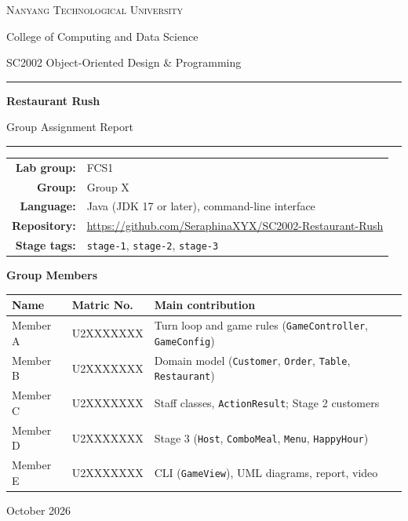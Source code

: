 \documentclass[11pt,a4paper]{article}
\begin{document}
\begin{titlepage}
\centering
\vspace*{0.6cm}
{\large\scshape Nanyang Technological University\par}
{\normalsize College of Computing and Data Science\par}
\vspace{1.2cm}
{\large SC2002 Object-Oriented Design \& Programming\par}
\vspace{0.4cm}
{\color{darkblue}\rule{0.75\textwidth}{1pt}\par}
\vspace{0.5cm}
{\Huge\bfseries Restaurant Rush\par}
\vspace{0.3cm}
{\Large Group Assignment Report\par}
\vspace{0.5cm}
{\color{darkblue}\rule{0.75\textwidth}{1pt}\par}
\vspace{1.0cm}
\begin{tabular}{@{}rl@{}}
\textbf{Lab group:} & FCS1 \\
\textbf{Group:} & Group X \\
\textbf{Language:} & Java (JDK 17 or later), command-line interface \\
\textbf{Repository:} & \url{https://github.com/SeraphinaXYX/SC2002-Restaurant-Rush} \\
\textbf{Stage tags:} & \texttt{stage-1}, \texttt{stage-2}, \texttt{stage-3}
\end{tabular}

\vspace{0.9cm}
{\large\bfseries Group Members\par}
\vspace{0.3cm}
\begin{tabular}{@{}>{\raggedright\arraybackslash}p{2.6cm}>{\raggedright\arraybackslash}p{2.6cm}>{\raggedright\arraybackslash}p{8.0cm}@{}}
\toprule
\textbf{Name} & \textbf{Matric No.} & \textbf{Main contribution} \\
\midrule
Member A & U2XXXXXXX & Turn loop and game rules (\texttt{GameController}, \texttt{GameConfig}) \\
Member B & U2XXXXXXX & Domain model (\texttt{Customer}, \texttt{Order}, \texttt{Table}, \texttt{Restaurant}) \\
Member C & U2XXXXXXX & Staff classes, \texttt{ActionResult}; Stage 2 customers \\
Member D & U2XXXXXXX & Stage 3 (\texttt{Host}, \texttt{ComboMeal}, \texttt{Menu}, \texttt{HappyHour}) \\
Member E & U2XXXXXXX & CLI (\texttt{GameView}), UML diagrams, report, video \\
\bottomrule
\end{tabular}

\vfill
{\large October 2026\par}
\end{titlepage}
\end{document}
